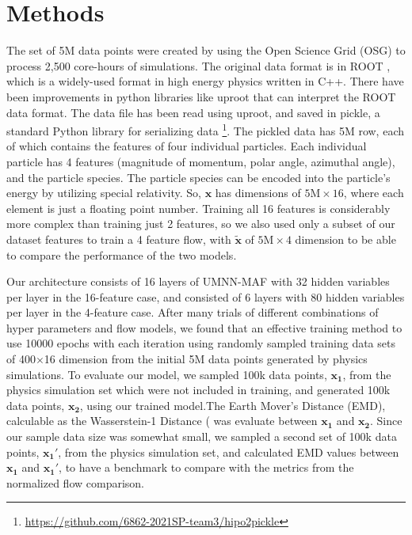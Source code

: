 \section{Methods}
The set of 5M data points were created by using the Open Science Grid (OSG) to process 2,500 core-hours of simulations. The original data format is in ROOT \cite{root}, which is a widely-used format in high energy physics written in C++. There have been improvements in python libraries like uproot \cite{uproot} that can interpret the ROOT data format. The data file has been read using uproot, and saved in pickle, a standard Python library for serializing data \footnote{\url{https://github.com/6862-2021SP-team3/hipo2pickle}}. The pickled data has 5M row, each of which contains the features of four individual particles. Each individual particle has 4 features (magnitude of momentum, polar angle, azimuthal angle), and the particle species. The particle species can be encoded into the particle's energy by utilizing special relativity. So, $\mathbf{x}$ has dimensions of $5\text{M}\times16$, where each element is just a floating point number. Training all 16 features is considerably more complex than training just 2 features, so we also used only a subset of our dataset features to train a 4 feature flow, with $\mathbf{\tilde{x}}$ of $5\text{M}\times4$ dimension to be able to compare the performance of the two models. 

Our architecture consists of 16 layers of UMNN-MAF with 32 hidden variables per layer in the 16-feature case, and consisted of 6 layers with 80 hidden variables per layer in the 4-feature case. After many trials of different combinations of hyper parameters and flow models, we found that an effective training method to use 10000 epochs with each iteration using randomly sampled training data sets of 400$\times$16 dimension from the initial 5M data points generated by physics simulations. To evaluate our model, we sampled 100k data points, $\mathbf{x_1}$, from the physics simulation set which were not included in training, and generated 100k data points, $\mathbf{x_2}$, using our trained model.The Earth Mover's Distance (EMD), calculable as the Wasserstein-1 Distance (\citet{Dobrushin} was evaluate between $\mathbf{x_1}$ and $\mathbf{x_2}$. Since our sample data size was somewhat small, we sampled a second set of 100k data points, $\mathbf{x_1'}$, from the physics simulation set, and calculated EMD values between  $\mathbf{x_1}$ and $\mathbf{x_1'}$, to have a benchmark to compare with the metrics from the normalized flow comparison.


